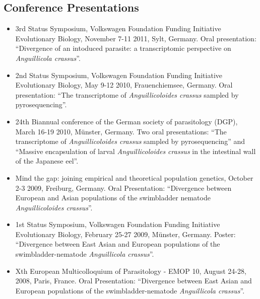 

\subsection*{Conference Presentations}

\begin{itemize}

\item 3rd Status Symposium, Volkswagen Foundation Funding Initiative
  Evolutionary Biology, November 7-11 2011, Sylt, Germany. Oral
  presentation: ``Divergence of an intoduced parasite: a
  transcriptomic perspective on \textit{Anguillicola crassus}''.

\item 2nd Status Symposium, Volkswagen Foundation Funding Initiative
  Evolutionary Biology, May 9-12 2010, Frauenchiemsee, Germany. Oral
  presentation: ``The transcriptome of \textit{Anguillicoloides
    crassus} sampled by pyrosequencing''.

\item 24th Biannual conference of the German society of parasitology
  (DGP), March 16-19 2010, M\"unster, Germany. Two oral presentations:
  ``The transcriptome of \textit{Anguillicoloides crassus} sampled by
  pyrosequencing'' and ``Massive encapsulation of larval
  \textit{Anguillicoloides crassus} in the intestinal wall of the
  Japanese eel''.

\item Mind the gap: joining empirical and theoretical population
  genetics, October 2-3 2009, Freiburg, Germany. Oral Presentation:
  ``Divergence between European and Asian populations of the
  swimbladder nematode \textit{Anguillicoloides crassus}''.

\item 1st Status Symposium, Volkswagen Foundation Funding Initiative
  Evolutionary Biology, February 25-27 2009, M\"unster,
  Germany. Poster: ``Divergence between East Asian and European
  populations of the swimbladder-nematode \textit{Anguillicola
    crassus}''.

\item Xth European Multicolloquium of Parasitology - EMOP 10, August
  24-28, 2008, Paris, France. Oral Presentation: ``Divergence between
  East Asian and European populations of the swimbladder-nematode
  \textit{Anguillicola crassus}''.

\end{itemize}

